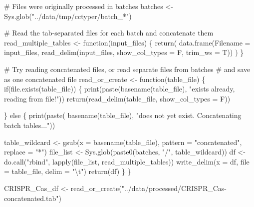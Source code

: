 \documentclass[
  twocolumn,
  landscape]{report}
\newenvironment{Shaded}{}{}
\newcommand{\AttributeTok}[1]{\textcolor[rgb]{0.84,0.23,0.29}{#1}}
\newcommand{\CommentTok}[1]{\textcolor[rgb]{0.42,0.45,0.49}{#1}}
\newcommand{\ControlFlowTok}[1]{\textcolor[rgb]{0.84,0.23,0.29}{#1}}
\newcommand{\FunctionTok}[1]{\textcolor[rgb]{0.44,0.26,0.76}{#1}}
\newcommand{\NormalTok}[1]{\textcolor[rgb]{0.14,0.16,0.18}{#1}}
\newcommand{\OtherTok}[1]{\textcolor[rgb]{0.44,0.26,0.76}{#1}}
\newcommand{\SpecialCharTok}[1]{\textcolor[rgb]{0.00,0.36,0.77}{#1}}
\newcommand{\StringTok}[1]{\textcolor[rgb]{0.01,0.18,0.38}{#1}}
\begin{document}
\begin{Shaded}
\begin{Highlighting}[]
\CommentTok{\# Files were originally processed in batches}
\NormalTok{batches }\OtherTok{\textless{}{-}} \FunctionTok{Sys.glob}\NormalTok{(}\StringTok{"../data/tmp/cctyper/batch\_*"}\NormalTok{)}

\CommentTok{\# Read the tab{-}separated files for each batch and concatenate them}
\NormalTok{read\_multiple\_tables }\OtherTok{\textless{}{-}} \ControlFlowTok{function}\NormalTok{(input\_files) \{}
  \FunctionTok{return}\NormalTok{(}
    \FunctionTok{data.frame}\NormalTok{(}\AttributeTok{Filename =}\NormalTok{ input\_files,}
               \FunctionTok{read\_delim}\NormalTok{(input\_files,}
                          \AttributeTok{show\_col\_types =}\NormalTok{ F,}
                          \AttributeTok{trim\_ws =}\NormalTok{ T))}
\NormalTok{  )}
\NormalTok{\}}

\CommentTok{\# Try reading concatenated files, or read separate files from batches}
\CommentTok{\#  and save as one concatenated file}
\NormalTok{read\_or\_create }\OtherTok{\textless{}{-}} \ControlFlowTok{function}\NormalTok{(table\_file) \{}
  \ControlFlowTok{if}\NormalTok{(}\FunctionTok{file.exists}\NormalTok{(table\_file)) \{}
    \FunctionTok{print}\NormalTok{(}\FunctionTok{paste}\NormalTok{(}\FunctionTok{basename}\NormalTok{(table\_file), }\StringTok{"exists already, reading from file!"}\NormalTok{))}
    \FunctionTok{return}\NormalTok{(}\FunctionTok{read\_delim}\NormalTok{(table\_file, }\AttributeTok{show\_col\_types =}\NormalTok{ F))}
    
\NormalTok{  \} }\ControlFlowTok{else}\NormalTok{ \{}
    \FunctionTok{print}\NormalTok{(}\FunctionTok{paste}\NormalTok{(}
      \FunctionTok{basename}\NormalTok{(table\_file),}
      \StringTok{"does not yet exist. Concatenating batch tables..."}\NormalTok{))}
    
\NormalTok{    table\_wildcard }\OtherTok{\textless{}{-}} \FunctionTok{gsub}\NormalTok{(}\AttributeTok{x =} \FunctionTok{basename}\NormalTok{(table\_file),}
                           \AttributeTok{pattern =} \StringTok{"concatenated"}\NormalTok{,}
                           \AttributeTok{replace =} \StringTok{"*"}\NormalTok{)}
\NormalTok{    file\_list }\OtherTok{\textless{}{-}} \FunctionTok{Sys.glob}\NormalTok{(}\FunctionTok{paste0}\NormalTok{(batches, }\StringTok{"/"}\NormalTok{, table\_wildcard))}
\NormalTok{    df }\OtherTok{\textless{}{-}} \FunctionTok{do.call}\NormalTok{(}\StringTok{"rbind"}\NormalTok{, }\FunctionTok{lapply}\NormalTok{(file\_list, read\_multiple\_tables))}
    \FunctionTok{write\_delim}\NormalTok{(}\AttributeTok{x =}\NormalTok{ df, }\AttributeTok{file =}\NormalTok{ table\_file, }\AttributeTok{delim =} \StringTok{"}\SpecialCharTok{\textbackslash{}t}\StringTok{"}\NormalTok{)}
    \FunctionTok{return}\NormalTok{(df)}
\NormalTok{  \}}
\NormalTok{\}}


\NormalTok{CRISPR\_Cas\_df }\OtherTok{\textless{}{-}} \FunctionTok{read\_or\_create}\NormalTok{(}\StringTok{"../data/processed/CRISPR\_Cas{-}concatenated.tab"}\NormalTok{)}
\end{Highlighting}
\end{Shaded}
\end{document}

